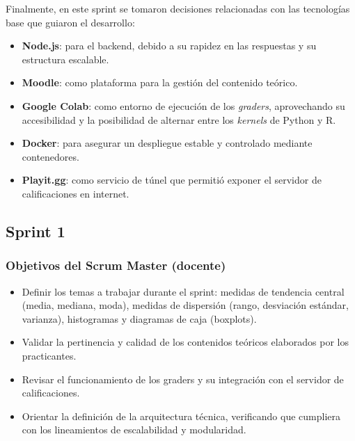 \documentclass[letter,oneside,12pt,spanish]{report}
\begin{document}
Finalmente, en este sprint se tomaron decisiones relacionadas con las tecnologías base que guiaron el desarrollo:  

\begin{itemize}
	\item \textbf{Node.js}: para el backend, debido a su rapidez en las respuestas y su estructura escalable.  
	\item \textbf{Moodle}: como plataforma para la gestión del contenido teórico.  
	\item \textbf{Google Colab}: como entorno de ejecución de los \textit{graders}, aprovechando su accesibilidad y la posibilidad de alternar entre los \textit{kernels} de Python y R.  
	\item \textbf{Docker}: para asegurar un despliegue estable y controlado mediante contenedores.  
	\item \textbf{Playit.gg}: como servicio de túnel que permitió exponer el servidor de calificaciones en internet.  
\end{itemize}

\subsection{Sprint 1}

\subsubsection*{Objetivos del Scrum Master (docente)}
\begin{itemize}
	\item Definir los temas a trabajar durante el sprint: medidas de tendencia central (media, mediana, moda), medidas de dispersión (rango, desviación estándar, varianza), histogramas y diagramas de caja (boxplots).
	\item Validar la pertinencia y calidad de los contenidos teóricos elaborados por los practicantes.
	\item Revisar el funcionamiento de los graders y su integración con el servidor de calificaciones.
	\item Orientar la definición de la arquitectura técnica, verificando que cumpliera con los lineamientos de escalabilidad y modularidad.
\end{itemize}
\end{document}
